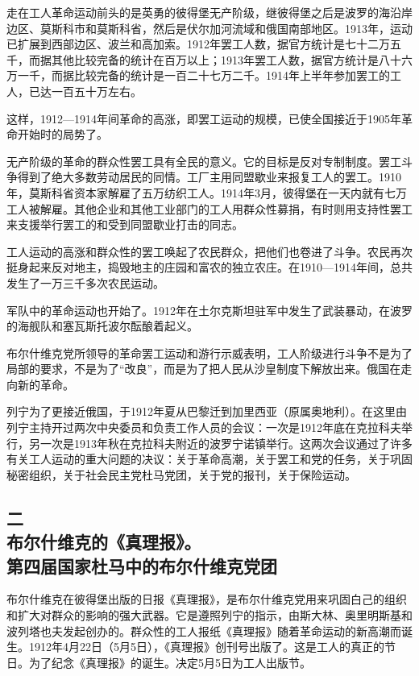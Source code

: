 走在工人革命运动前头的是英勇的彼得堡无产阶级，继彼得堡之后是波罗的海沿岸边区、莫斯科市和莫斯科省，然后是伏尔加河流域和俄国南部地区。1913年，运动已扩展到西部边区、波兰和高加索。1912年罢工人数，据官方统计是七十二万五千，而据其他比较完备的统计在百万以上；1913年罢工人数，据官方统计是八十六万一千，而据比较完备的统计是一百二十七万二千。1914年上半年参加罢工的工人，已达一百五十万左右。

这样，1912—1914年间革命的高涨，即罢工运动的规模，已使全国接近于1905年革命开始时的局势了。

无产阶级的革命的群众性罢工具有全民的意义。它的目标是反对专制制度。罢工斗争得到了绝大多数劳动居民的同情。工厂主用同盟歇业来报复工人的罢工。1910年，莫斯科省资本家解雇了五万纺织工人。1914年3月，彼得堡在一天内就有七万工人被解雇。其他企业和其他工业部门的工人用群众性募捐，有时则用支持性罢工来支援举行罢工的和受到同盟歇业打击的同志。

工人运动的高涨和群众性的罢工唤起了农民群众，把他们也卷进了斗争。农民再次挺身起来反对地主，捣毁地主的庄园和富农的独立农庄。在1910—1914年间，总共发生了一万三千多次农民运动。

军队中的革命运动也开始了。1912年在土尔克斯坦驻军中发生了武装暴动，在波罗的海舰队和塞瓦斯托波尔酝酿着起义。

布尔什维克党所领导的革命罢工运动和游行示威表明，工人阶级进行斗争不是为了局部的要求，不是为了“改良”，而是为了把人民从沙皇制度下解放出来。俄国在走向新的革命。

列宁为了更接近俄国，于1912年夏从巴黎迁到加里西亚（原属奥地利）。在这里由列宁主持开过两次中央委员和负责工作人员的会议：一次是1912年底在克拉科夫举行，另一次是1913年秋在克拉科夫附近的波罗宁诺镇举行。这两次会议通过了许多有关工人运动的重大问题的决议：关于革命高潮，关于罢工和党的任务，关于巩固秘密组织，关于社会民主党杜马党团，关于党的报刊，关于保险运动。


\subsection[二\q 布尔什维克的《真理报》。第四届国家杜马中的布尔什维克党团]{二\\布尔什维克的《真理报》。\\第四届国家杜马中的布尔什维克党团}

布尔什维克在彼得堡出版的日报《真理报》，是布尔什维克党用来巩固白己的组织和扩大对群众的影响的强大武器。它是遵照列宁的指示，由斯大林、奥里明斯基和波列塔也夫发起创办的。群众性的工人报纸《真理报》随着革命运动的新高潮而诞生。1912年4月22日（5月5日），《真理报》创刊号出版了。这是工人的真正的节日。为了纪念《真理报》的诞生。决定5月5日为工人出版节。


